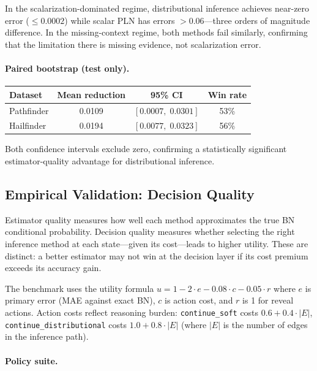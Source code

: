 \documentclass[11pt,openany]{report}
\begin{document}
In the scalarization-dominated regime, distributional inference
achieves near-zero error ($\le 0.0002$) while scalar PLN has errors
$> 0.06$---three orders of magnitude difference.  In the
missing-context regime, both methods fail similarly, confirming
that the limitation there is missing evidence, not scalarization error.

\paragraph{Paired bootstrap (test only).}

\begin{center}
\begin{tabular}{lccc}
\toprule
\textbf{Dataset} & \textbf{Mean reduction} & \textbf{95\% CI} & \textbf{Win rate} \\
\midrule
Pathfinder & 0.0109 & $[0.0007,\; 0.0301]$ & 53\% \\
Hailfinder & 0.0194 & $[0.0077,\; 0.0323]$ & 56\% \\
\bottomrule
\end{tabular}
\end{center}

Both confidence intervals exclude zero, confirming a statistically
significant estimator-quality advantage for distributional inference.

\subsection*{Empirical Validation: Decision Quality}
\label{sec:distrib-decision}

Estimator quality measures how well each method approximates the true
BN conditional probability.  Decision quality measures whether
selecting the right inference method at each state---given its cost---leads
to higher utility.  These are distinct: a better estimator may not win
at the decision layer if its cost premium exceeds its accuracy gain.

The benchmark uses the utility formula
$u = 1 - 2 \cdot e - 0.08 \cdot c - 0.05 \cdot r$
where $e$ is primary error (MAE against exact BN), $c$ is action cost,
and $r$ is 1 for reveal actions.  Action costs reflect reasoning burden:
\texttt{continue\_soft} costs $0.6 + 0.4 \cdot |E|$,
\texttt{continue\_distributional} costs $1.0 + 0.8 \cdot |E|$
(where $|E|$ is the number of edges in the inference path).

\paragraph{Policy suite.}
\end{document}
